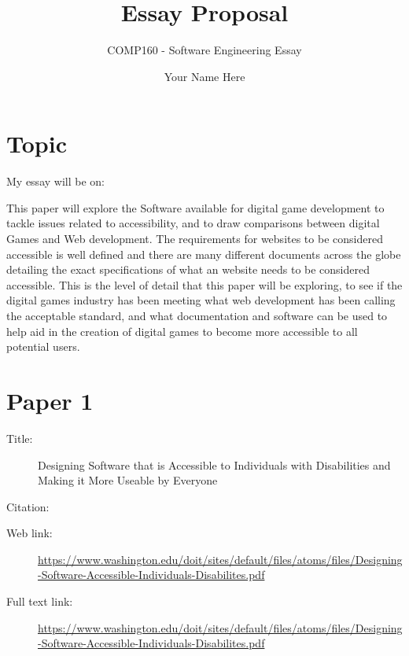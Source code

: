 \documentclass{scrartcl}
\title{Essay Proposal}
\subtitle{COMP160 - Software Engineering Essay}
\author{Your Name Here}
\begin{document}
\maketitle

\section*{Topic}

My essay will be on:

This paper will explore the Software available for digital game development to tackle issues related to accessibility, and to draw comparisons between digital Games and Web development. The requirements for websites to be considered accessible is well defined and there are many different documents across the globe detailing the exact specifications of what an website needs to be considered accessible. This is  the level of detail that this paper will be exploring, to see if the digital games industry has been meeting what web development has been calling the acceptable standard, and what documentation and software can be used to help aid in the creation of digital games to become more accessible to all potential users.

\section*{Paper 1}
\begin{description}
\item[Title:] Designing Software that is Accessible to Individuals with Disabilities and Making it More Useable by Everyone
\item[Citation:] \cite{Sheryl Burgstahler, Ph.D.}
\item[Web link:] \url{https://www.washington.edu/doit/sites/default/files/atoms/files/Designing-Software-Accessible-Individuals-Disabilites.pdf}
\item[Full text link:] \url{https://www.washington.edu/doit/sites/default/files/atoms/files/Designing-Software-Accessible-Individuals-Disabilites.pdf}
\end{description}
\end{document}
